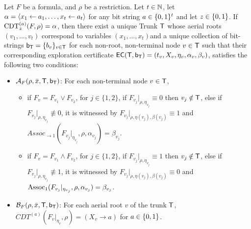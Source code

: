\begin{lemma}
\label{lem:banyan}
    Let $F$ be a \demorgan formula, and $\rho$ be a restriction. Let $t \in \mathbb{N}$,  let $\alpha = \left\langle x_1 \gets a_1, \dots, x_t \gets a_t \right\rangle$ for any bit string $a \in \{0,1\}^t$ and let $z \in \{0,1\}$.%
    If $\operatorname{CDT}^{(a)}_z(F, \rho) = \alpha$, then there exist a unique Trunk $\mathsf{T}$ whose aerial roots $(v_1, \dots, v_t)$ correspond to variables $(x_1, \dots, x_t)$and a unique collection of bit-strings $\mathsf{b_T} = \{b_v\}_{v \in \mathsf{T}}$ for each non-root, non-terminal node $v \in \mathsf{T}$ such that their corresponding exploration certificate $\mathsf{EC}(\mathsf{T}, \mathsf{b_T}) = (t_v, X_v, \eta_v, \alpha_v, \beta_v)$, satisfies the following two conditions:
    \begin{itemize}
        \item $\mathcal{A}_F(\rho,\bar{x}, \mathsf{T}, \mathsf{b_T})$: For each non-terminal node $v \in \mathsf{T}$, 
        \begin{itemize}
            \item if $F_v = F_{v_1} \lor F_{v_2}$, for $j \in \{1,2\}$, if $F_{v_j}|_{\rho,\eta_{v_j}} \equiv 0$ then $v_j \notin \mathsf{T}$, else if $F_{v_j}|_{\rho,\eta_{v_j}} \not\equiv 0$, it is witnessed by $F_{v_j}|_{\rho,\eta(v_j),\beta(v_j)} \equiv 1$ and $Assoc_{\to 1}(F_{v_j}|_{\eta_{v_j}}, \rho, \alpha_{v_j}) = \beta_{v_j}$.     
            \item if $F_v = F_{v_1} \land F_{v_2}$, for $j \in \{1,2\}$, if $F_{v_j}|_{\rho,\eta_{v_j}} \equiv 1$ then $v_j \notin \mathsf{T}$, else if $F_{v_j}|_{\rho,\eta_{v_j}} \not\equiv 1$, it is witnessed by $F_{v_j}|_{\rho,\eta(v_j),\beta(v_j)} \equiv 0$ and 
            $\operatorname{Assoc}_1(F_{v_j}|_{\eta_{v_j}}, \rho, \alpha_{v_j}) = \beta_{v_j}$.
        \end{itemize}
        \item $\mathcal{B}_F(\rho,\bar{x}, \mathsf{T}, \mathsf{b_T})$: For each aerial root $v$ of the trunk $\mathsf{T}$, $CDT^{(a)}(F_v|_{\eta_v}, \rho) = (X_v \to a)$ for $a \in \{0,1\}$. 
    \end{itemize}
\end{lemma}

